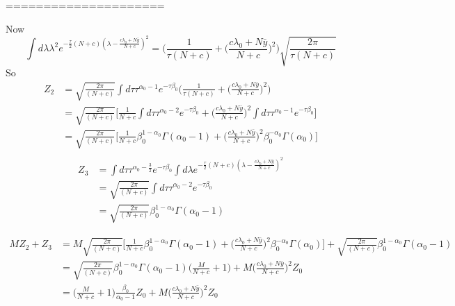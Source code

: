 =====================


Now
\begin{equation}
	\int d\lambda \lambda^2 e^{-\frac{\tau}{2}(N+c)(\lambda-\frac{c\lambda_0+N\bar{y}}{N+c})^2}=\bigg(\frac{1}{\tau(N+c)}+\bigg(\frac{c\lambda_0+N\bar{y}}{N+c}\bigg)^2\bigg)\sqrt{\frac{2\pi}{\tau(N+c)}}
\end{equation}	
So
\begin{equation}
	\begin{split}
		Z_2 & = \sqrt{\frac{2\pi}{(N+c)}}\int d\tau \tau^{\alpha_0-1}e^{-\tau\beta_0} \bigg(\frac{1}{\tau(N+c)}+\bigg(\frac{c\lambda_0+N\bar{y}}{N+c}\bigg)^2\bigg)\\
		& = \sqrt{\frac{2\pi}{(N+c)}}\bigg[\frac{1}{N+c}\int d\tau \tau^{\alpha_0-2}e^{-\tau\beta_0}+\bigg(\frac{c\lambda_0+N\bar{y}}{N+c}\bigg)^2\int d\tau \tau^{\alpha_0-1}e^{-\tau\beta_0}\bigg]\\
		& = \sqrt{\frac{2\pi}{(N+c)}}\bigg[\frac{1}{N+c}\beta_0^{1-\alpha_0}\Gamma(\alpha_0-1)+\bigg(\frac{c\lambda_0+N\bar{y}}{N+c}\bigg)^2\beta_0^{-\alpha_0}\Gamma(\alpha_0) \bigg]\\
	\end{split}
\end{equation}
\begin{equation}
	\begin{split}
		Z_3 &= \int d\tau \tau^{\alpha_0-\frac{3}{2}}e^{-\tau\beta_0} \int d\lambda  e^{-\frac{\tau}{2}(N+c)(\lambda-\frac{c\lambda_0+N\bar{y}}{N+c})^2}\\
		&=\sqrt{\frac{2\pi}{(N+c)}}\int d\tau \tau^{\alpha_0-2}e^{-\tau\beta_0}\\
		&=\sqrt{\frac{2\pi}{(N+c)}}\beta_0^{1-\alpha_0}\Gamma(\alpha_0-1)
	\end{split}
\end{equation}






\begin{equation}
	\begin{split}
		MZ_2+Z_3&=M\sqrt{\frac{2\pi}{(N+c)}}\bigg[\frac{1}{N+c}\beta_0^{1-\alpha_0}\Gamma(\alpha_0-1)+\bigg(\frac{c\lambda_0+N\bar{y}}{N+c}\bigg)^2\beta_0^{-\alpha_0}\Gamma(\alpha_0) \bigg]+\sqrt{\frac{2\pi}{(N+c)}}\beta_0^{1-\alpha_0}\Gamma(\alpha_0-1)\\
		&=\sqrt{\frac{2\pi}{(N+c)}}\beta_0^{1-\alpha_0}\Gamma(\alpha_0-1)\bigg(\frac{M}{N+c}+1\bigg)+M\bigg(\frac{c\lambda_0+N\bar{y}}{N+c}\bigg)^2Z_0 \\
		&=\bigg(\frac{M}{N+c}+1\bigg)\frac{\beta_0}{\alpha_0-1}Z_0+M\bigg(\frac{c\lambda_0+N\bar{y}}{N+c}\bigg)^2Z_0 \\
	\end{split}
\end{equation}



